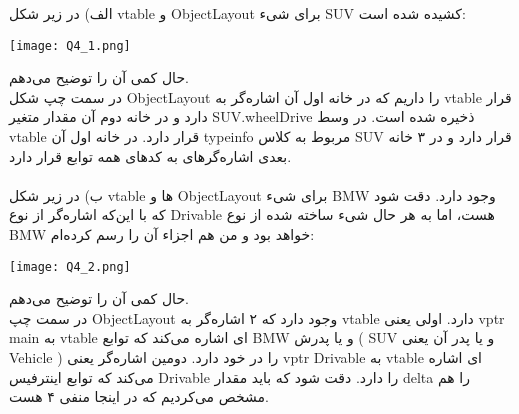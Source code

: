 
الف) در زیر شکل vtable و ObjectLayout برای شیء SUV کشیده شده است:
\graphicspath{{./images/}}
\begin{center}
	\texttt{[image: Q4\_1.png]}
\end{center}
حال کمی آن را توضیح می‌دهم.\\
در سمت چپ شکل ObjectLayout را داریم که در خانه اول آن اشاره‌گر به vtable قرار دارد و در خانه دوم آن مقدار متغیر SUV.wheelDrive ذخیره شده است.
در وسط vtable قرار دارد. در خانه اول آن typeinfo مربوط به کلاس SUV قرار دارد و در ۳ خانه بعدی اشاره‌گرهای به کدهای همه توابع قرار دارد.\\\\
ب) در زیر شکل  vtable ها و ObjectLayout برای شیء BMW وجود دارد. دقت شود که با این‌که اشاره‌گر از نوع Drivable هست، اما به هر حال شیء ساخته شده از نوع BMW خواهد بود و من هم اجزاء آن را رسم کرده‌ام:
\graphicspath{{./images/}}
\begin{center}
	\texttt{[image: Q4\_2.png]}
\end{center}
حال کمی آن را توضیح می‌دهم.\\
در سمت چپ ObjectLayout وجود دارد که ۲ اشاره‌گر به vtable دارد. اولی یعنی vptr main به vtable ای اشاره می‌کند که توابع BMW و یا پدرش ( SUV و یا پدر آن یعنی Vehicle ) را در خود دارد. دومین اشاره‌‌گر یعنی vptr Drivable به vtable ای اشاره می‌کند که توابع  اینترفیس Drivable را دارد. دقت شود که باید مقدار delta را هم مشخص می‌کردیم که در اینجا منفی ۴ هست.